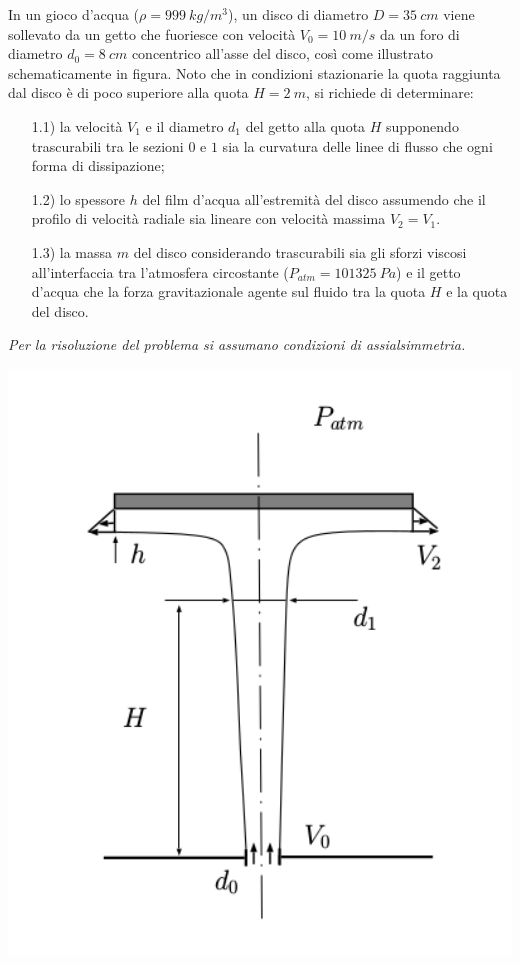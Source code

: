 \begin{minipage}[l]{0.5\textwidth}
 \begin{exerciseS}
  In un gioco d'acqua ($\rho=999\ kg/m^3$), un disco di diametro $D=35\ cm$ viene sollevato 
  da un getto che fuoriesce con velocit\`{a} $V_0=10\ m/s$ da un foro di diametro $d_0=8\ cm$ concentrico 
  all'asse del disco, cos\`i come illustrato schematicamente in figura. Noto che in condizioni 
  stazionarie la quota raggiunta dal disco \`{e} di poco superiore alla quota $H=2\ m$, si richiede 
  di determinare:
  \begin{itemize}
   \item[1.1)] la velocità $V_1$ e il diametro $d_1$ del getto alla quota $H$
         supponendo trascurabili tra le sezioni $0$ e $1$ sia la curvatura delle linee di flusso 
         che ogni forma di dissipazione;
   \item[1.2)] lo spessore $h$ del film d'acqua all'estremit\`{a} del disco assumendo
         che il profilo di velocit\`{a} radiale sia lineare con velocit\`{a} massima $V_2=V_1$.     
   \item[1.3)] la massa $m$ del disco considerando trascurabili sia gli sforzi viscosi all'interfaccia tra l'atmosfera 
               circostante ($P_{atm}=101325\ Pa$) e il getto d'acqua che la forza gravitazionale agente sul fluido 
               tra la quota $H$ e la quota del disco.
  \end{itemize}
 \end{exerciseS}
 \textit{Per la risoluzione del problema si assumano condizioni di assialsimmetria.}
\end{minipage}
\hspace{3mm}
\begin{minipage}[r]{0.5\textwidth}
 \centering
  \includegraphics[width=1.0\textwidth]{./fig/jet}
\end{minipage}


